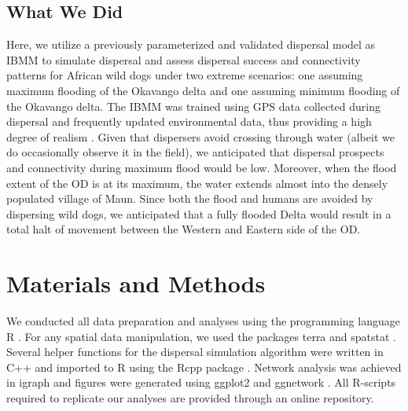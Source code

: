 \documentclass[abstract=on,10pt,a4paper,bibliography=totocnumbered]{article}
\begin{document}
\subsection{What We Did}
Here, we utilize a previously parameterized and validated dispersal model as
IBMM to simulate dispersal and assess dispersal success and connectivity
patterns for African wild dogs under two extreme scenarios: one assuming maximum
flooding of the Okavango delta and one assuming minimum flooding of the Okavango
delta. The IBMM was trained using GPS data collected during dispersal and
frequently updated environmental data, thus providing a high degree of realism
\citep{Hofmann.2021}. Given that dispersers avoid crossing through water (albeit
we do occasionally observe it in the field), we anticipated that dispersal
prospects and connectivity during maximum flood would be low. Moreover,  when
the flood extent of the OD is at its maximum, the water extends almost into the
densely populated village of Maun. Since both the flood and humans are avoided
by dispersing wild dogs, we anticipated that a fully flooded Delta would result
in a total halt of movement between the Western and Eastern side of the OD.

\section{Materials and Methods}
We conducted all data preparation and analyses using the programming language
\textsf{R} \citep{RCoreTeam.2022}. For any spatial data manipulation, we used
the packages \textsf{terra} \citep{Hijmans.2022} and \textsf{spatstat}
\citep{Baddeley.2015}. Several helper functions for the dispersal simulation
algorithm were written in \textsf{C++} and imported to R using the \textsf{Rcpp}
package \citep{Eddelbuettel.2011}. Network analysis was achieved in
\textsf{igraph} \citep{Csardi.2006} and figures were generated using
\textsf{ggplot2} \citep{Wickham.2016} and \textsf{ggnetwork}
\citep{Briatte.2021}. All R-scripts required to replicate our analyses are
provided through an online repository.
\end{document}
